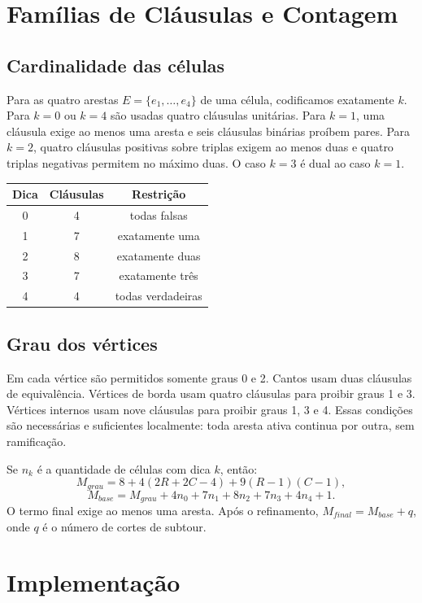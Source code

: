 \documentclass[11pt,a4paper]{article}
\begin{document}
\section{Famílias de Cláusulas e Contagem}
\subsection{Cardinalidade das células}
Para as quatro arestas $E=\{e_1,\ldots,e_4\}$ de uma célula, codificamos exatamente $k$. Para $k=0$ ou $k=4$ são usadas quatro cláusulas unitárias. Para $k=1$, uma cláusula exige ao menos uma aresta e seis cláusulas binárias proíbem pares. Para $k=2$, quatro cláusulas positivas sobre triplas exigem ao menos duas e quatro triplas negativas permitem no máximo duas. O caso $k=3$ é dual ao caso $k=1$.

\begin{center}
\begin{tabular}{ccc}
\toprule
Dica & Cláusulas & Restrição \\
\midrule
0 & 4 & todas falsas \\
1 & 7 & exatamente uma \\
2 & 8 & exatamente duas \\
3 & 7 & exatamente três \\
4 & 4 & todas verdadeiras \\
\bottomrule
\end{tabular}
\end{center}

\subsection{Grau dos vértices}
Em cada vértice são permitidos somente graus 0 e 2. Cantos usam duas cláusulas de equivalência. Vértices de borda usam quatro cláusulas para proibir graus 1 e 3. Vértices internos usam nove cláusulas para proibir graus 1, 3 e 4. Essas condições são necessárias e suficientes localmente: toda aresta ativa continua por outra, sem ramificação.

Se $n_k$ é a quantidade de células com dica $k$, então:
\[
M_{grau}=8+4(2R+2C-4)+9(R-1)(C-1),
\]
\[
M_{base}=M_{grau}+4n_0+7n_1+8n_2+7n_3+4n_4+1.
\]
O termo final exige ao menos uma aresta. Após o refinamento, $M_{final}=M_{base}+q$, onde $q$ é o número de cortes de subtour.
\newpage

\section{Implementação}
\end{document}
